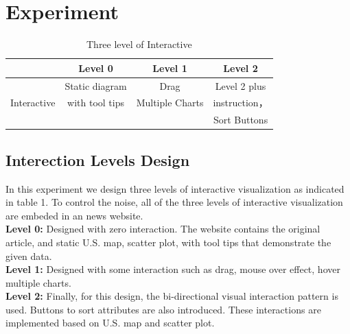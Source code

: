 \documentclass[9pt,journal,compsoc]{IEEEtran}
\begin{document}
\section{Experiment}
\large
\begin{table}
	\centering
		\begin{tabular}{|c|c|c|c|}
		\hline
     	&Level 0&Level 1&Level 2\\
     	\hline
            		&Static diagram&Drag & Level 2 plus\\ 
        Interactive& with tool tips&Multiple Charts&instruction，\\
					&             &   			&Sort Buttons\\
     	\hline
        \end{tabular}
     \caption{Three level of Interactive}
\end{table}
\subsection{Interection Levels Design}
In this experiment we design three levels of interactive visualization as indicated in table 1. To control the noise, all of the three levels of interactive visualization are embeded in an news website.\\
\textbf{Level 0:} Designed with zero interaction. The website contains the original article, and static U.S. map, scatter plot, with tool tips that demonstrate the given data. \\
\textbf{Level 1:} Designed with some interaction such as drag, mouse over effect, hover multiple charts. \\
\textbf{Level 2:} Finally, for this design, the bi-directional visual interaction pattern is used. Buttons to sort attributes are also introduced. These interactions are implemented based on U.S. map and scatter plot.
\end{document}
